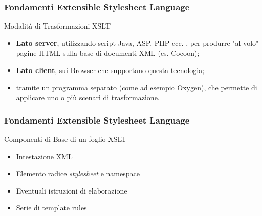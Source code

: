 \begin{frame}
    \frametitle{Fondamenti Extensible Stylesheet Language}
    \addtocounter{nframe}{1}
    

     \begin{block}{Modalità di Trasformazioni XSLT}
         \begin{itemize}
            \item \textbf{Lato server}, utilizzando script Java, ASP, PHP ecc. , per produrre "al volo" pagine HTML sulla base di documenti XML (es. Cocoon);
            \item \textbf{Lato client}, sui Browser che supportano questa tecnologia;
            \item tramite un programma separato (come ad esempio Oxygen), che permette di applicare uno o più scenari di trasformazione.
        \end{itemize}
     \end{block}
    
\end{frame}

\begin{frame}
    \frametitle{Fondamenti Extensible Stylesheet Language}
    \addtocounter{nframe}{1}
    

     \begin{block}{Componenti di Base di un foglio XSLT}
         \begin{itemize}
            \item Intestazione XML
            \item Elemento radice \textit{stylesheet} e namespace
            \item Eventuali istruzioni di elaborazione
            \item Serie di template rules
        \end{itemize}
     \end{block}
    
\end{frame}

